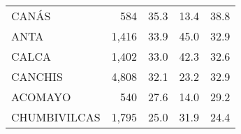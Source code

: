 \begin{tabular}{@{}lrrrr@{}}
	\cellcolor[HTML]{FD6864}CANÁS                                           & 584                                                                   & 35.3                                                                             & 13.4                                                                        & 38.8                                                                                \\
	\cellcolor[HTML]{FD6864}ANTA                                            & 1,416                                                                 & 33.9                                                                             & 45.0                                                                        & 32.9                                                                                \\
	\cellcolor[HTML]{FD6864}CALCA                                           & 1,402                                                                 & 33.0                                                                             & 42.3                                                                        & 32.6                                                                                \\
	\cellcolor[HTML]{FD6864}CANCHIS                                         & 4,808                                                                 & 32.1                                                                             & 23.2                                                                        & 32.9                                                                                \\
	\cellcolor[HTML]{FD6864}ACOMAYO                                         & 540                                                                   & 27.6                                                                             & 14.0                                                                        & 29.2                                                                                \\
	\cellcolor[HTML]{FD6864}CHUMBIVILCAS                                    & 1,795                                                                 & 25.0                                                                             & 31.9                                                                        & 24.4                                                                                \\

\end{tabular}
